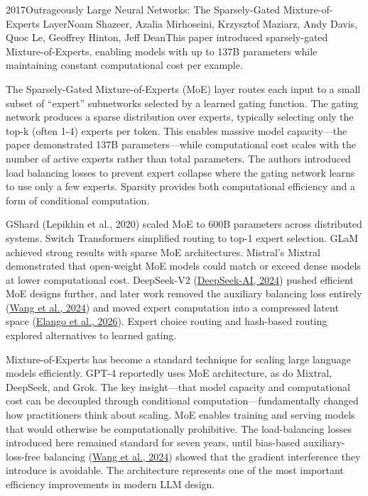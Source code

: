 
\begin{papersummary}{2017}{Outrageously Large Neural Networks: The Sparsely-Gated Mixture-of-Experts Layer}{Noam Shazeer, Azalia Mirhoseini, Krzysztof Maziarz, Andy Davis, Quoc Le, Geoffrey Hinton, Jeff Dean}{This paper introduced sparsely-gated Mixture-of-Experts, enabling models with up to 137B parameters while maintaining constant computational cost per example.}

The Sparsely-Gated Mixture-of-Experts (MoE) layer routes each input to a small subset of ``expert'' subnetworks selected by a learned gating function. The gating network produces a sparse distribution over experts, typically selecting only the top-k (often 1-4) experts per token. This enables massive model capacity---the paper demonstrated 137B parameters---while computational cost scales with the number of active experts rather than total parameters. The authors introduced load balancing losses to prevent expert collapse where the gating network learns to use only a few experts. Sparsity provides both computational efficiency and a form of conditional computation.

GShard (Lepikhin et al., 2020) scaled MoE to 600B parameters across distributed systems. Switch Transformers simplified routing to top-1 expert selection. GLaM achieved strong results with sparse MoE architectures. Mistral's Mixtral demonstrated that open-weight MoE models could match or exceed dense models at lower computational cost. DeepSeek-V2 (\hyperref[paper:deepseek-2024-v2]{DeepSeek-AI, 2024}) pushed efficient MoE designs further, and later work removed the auxiliary balancing loss entirely (\hyperref[paper:wang-2024-auxfree]{Wang et al., 2024}) and moved expert computation into a compressed latent space (\hyperref[paper:elango-2026-latentmoe]{Elango et al., 2026}). Expert choice routing and hash-based routing explored alternatives to learned gating.

Mixture-of-Experts has become a standard technique for scaling large language models efficiently. GPT-4 reportedly uses MoE architecture, as do Mixtral, DeepSeek, and Grok. The key insight---that model capacity and computational cost can be decoupled through conditional computation---fundamentally changed how practitioners think about scaling. MoE enables training and serving models that would otherwise be computationally prohibitive. The load-balancing losses introduced here remained standard for seven years, until bias-based auxiliary-loss-free balancing (\hyperref[paper:wang-2024-auxfree]{Wang et al., 2024}) showed that the gradient interference they introduce is avoidable. The architecture represents one of the most important efficiency improvements in modern LLM design.

\end{papersummary}

